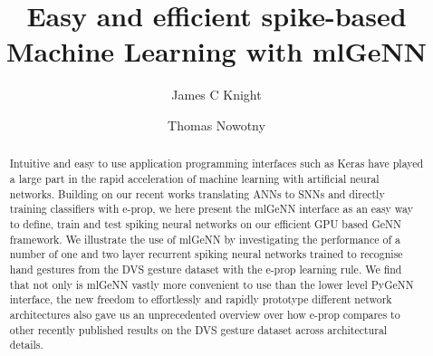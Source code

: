 \documentclass[sigconf]{acmart}
\begin{document}
\title{Easy and efficient spike-based Machine Learning with mlGeNN}

\author{James C Knight}

\author{Thomas Nowotny}
\renewcommand{\shortauthors}{Knight and Nowotny}

\begin{abstract}
  Intuitive and easy to use application programming interfaces such as Keras have played a large part in the rapid acceleration of machine learning with artificial neural networks.
  Building on our recent works translating ANNs to SNNs and directly training classifiers with e-prop, we here present the mlGeNN interface as an easy way to define, train and test spiking neural networks on our efficient GPU based GeNN framework.
  We illustrate the use of mlGeNN by investigating the performance of a number of one and two layer recurrent spiking neural networks trained to recognise hand gestures from the DVS gesture dataset with the e-prop learning rule.
  We find that not only is mlGeNN vastly more convenient to use than the lower level PyGeNN interface, the new freedom to effortlessly and rapidly prototype different network architectures also gave us an unprecedented overview over how e-prop compares to other recently published results on the DVS gesture dataset across architectural details. 
\end{abstract}
\end{document}
